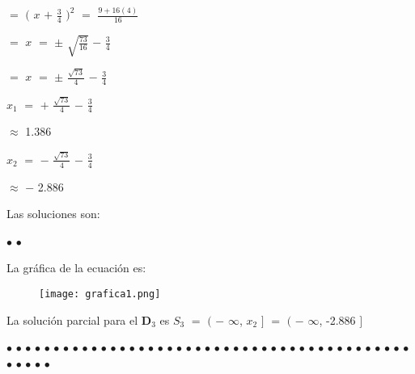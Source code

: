 \documentclass[12pt]{article}
\newenvironment{MyColorPar}[1]{%
    \leavevmode\color{#1}\ignorespaces%
}{%
}%
\begin{document}
\hspace{4cm} $=$ $\big($ $x$ $+$ {\Large{$\frac{3}{4}$}} $\big)^{2}$ $=$ {\Large{$\frac{9 + 16(4)}{16}$}} \vspace{0.5cm}

\hspace{4cm} $=$  $x$ $=$ $\pm$ {\large{$\sqrt{\frac{73}{16}}$}} $-$ {\Large{$\frac{3}{4}$}} \vspace{0.5cm}

\hspace{4cm} $=$  $x$ $=$ $\pm$ {\Large{$\frac{\sqrt{73}}{4}$}} $-$ {\Large{$\frac{3}{4}$}} \vspace{0.5cm}


$x_{1}$ $=$ $+$ {\Large{$\frac{\sqrt{73}}{4}$}} $-$ {\Large{$\frac{3}{4}$}} \vspace{0.5cm}

\hspace{0.4cm} $\approx$ 1.386 \vspace{0.5cm}

$x_{2}$ $=$ $-$ {\Large{$\frac{\sqrt{73}}{4}$}} $-$ {\Large{$\frac{3}{4}$}} \vspace{0.5cm}

\hspace{0.4cm} $\approx$ $-$ 2.886 \vspace{0.5cm}
 
Las soluciones son: \vspace{0.5cm}

\hspace{5cm} $\bullet$  \hspace{0.2cm} $\bullet$  

La gráfica de la ecuación es: \vspace{0.5cm} 

\begin{figure}[htb] \centering

    \texttt{[image: grafica1.png]} 
    
\end{figure} \vspace{0.5cm}

La solución parcial para el {\bfseries{{\textcolor{Burnt Sienna}{\mbox{D$_{3}$}}}}} es $S_{3}$ $=$ $\big($ $-$ $\infty$, $x_{2}$ $\big]$ $=$ $\big($ $-$ $\infty$, -2.886 $\big]$
\vspace{1cm}

\begin{MyColorPar}{pakistangreen}
$\bullet$ $\bullet$ $\bullet$ $\bullet$ $\bullet$ $\bullet$ $\bullet$ $\bullet$ $\bullet$ $\bullet$ $\bullet$ $\bullet$ $\bullet$ $\bullet$ $\bullet$ $\bullet$ $\bullet$ $\bullet$ $\bullet$ $\bullet$ $\bullet$ $\bullet$ $\bullet$ $\bullet$ $\bullet$ $\bullet$ $\bullet$ $\bullet$ $\bullet$ $\bullet$ $\bullet$ $\bullet$ $\bullet$ $\bullet$ $\bullet$ $\bullet$ $\bullet$ $\bullet$ $\bullet$ $\bullet$ $\bullet$ $\bullet$ $\bullet$ $\bullet$ $\bullet$ $\bullet$ $\bullet$ $\bullet$ 
\end{MyColorPar} \vspace{.5cm}
\end{document}
